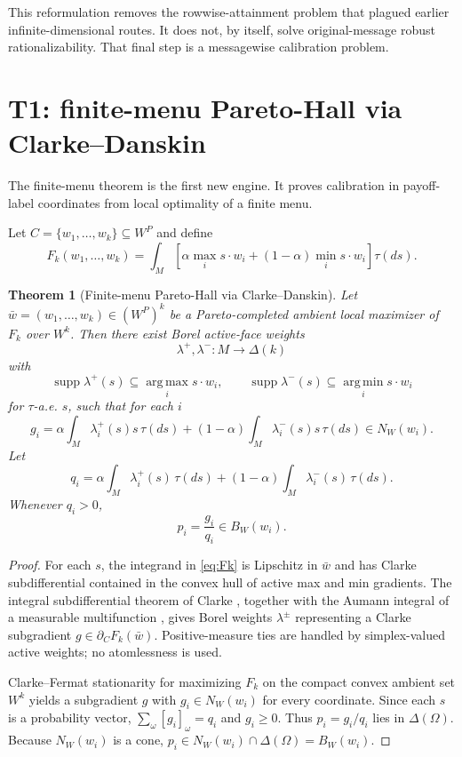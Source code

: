 \documentclass[11pt]{article}
\newtheorem{theorem}{Theorem}
\theoremstyle{definition}
\theoremstyle{remark}
\newcommand{\Om}{\Omega}
\newcommand{\suppset}{\operatorname{supp}}
\newcommand{\argmin}{\operatorname*{arg\,min}}
\newcommand{\argmax}{\operatorname*{arg\,max}}
\begin{document}
This reformulation removes the rowwise-attainment problem that plagued earlier infinite-dimensional routes. It does not, by itself, solve original-message robust rationalizability. That final step is a messagewise calibration problem.

\section{T1: finite-menu Pareto-Hall via Clarke--Danskin}\label{sec:t1}

The finite-menu theorem is the first new engine. It proves calibration in payoff-label coordinates from local optimality of a finite menu.

Let $C=\{w_1,\ldots,w_k\}\subseteq W^P$ and define
\begin{equation}\label{eq:Fk}
  F_k(w_1,\ldots,w_k)
  = \int_M\left[\alpha\max_i s\cdot w_i +(1-\alpha)
             \min_i s\cdot w_i\right]\tau(ds).
\end{equation}

\begin{theorem}[Finite-menu Pareto-Hall via Clarke--Danskin]\label{thm:T1}
Let $\bar w=(w_1,\ldots,w_k)\in(W^P)^k$ be a Pareto-completed ambient local maximizer of $F_k$ over $W^k$. Then there exist Borel active-face weights
\[
  \lambda^+,\lambda^-:M\to\Delta(k)
\]
with
\[
  \suppset\lambda^+(s)\subseteq\argmax_i s\cdot w_i,
  \qquad
  \suppset\lambda^-(s)\subseteq\argmin_i s\cdot w_i
\]
for $\tau$-a.e. $s$, such that for each $i$
\begin{equation}\label{eq:giqi}
  g_i
  = \alpha\int_M\lambda_i^+(s)s\,\tau(ds)
    +(1-\alpha)\int_M\lambda_i^-(s)s\,\tau(ds)
  \in N_W(w_i).
\end{equation}
Let
\begin{equation}\label{eq:qi}
  q_i
  = \alpha\int_M\lambda_i^+(s)\,\tau(ds)
    +(1-\alpha)\int_M\lambda_i^-(s)\,\tau(ds).
\end{equation}
Whenever $q_i>0$,
\begin{equation}\label{eq:pi}
  p_i=\frac{g_i}{q_i}\in B_W(w_i).
\end{equation}
\end{theorem}

\begin{proof}
For each $s$, the integrand in \eqref{eq:Fk} is Lipschitz in $\bar w$ and has Clarke subdifferential contained in the convex hull of active max and min gradients. The integral subdifferential theorem of Clarke \cite{Clarke1983}, together with the Aumann integral of a measurable multifunction \cite{Aumann1965,Hildenbrand1974}, gives Borel weights $\lambda^\pm$ representing a Clarke subgradient $g\in\partial_C F_k(\bar w)$. Positive-measure ties are handled by simplex-valued active weights; no atomlessness is used.

Clarke--Fermat stationarity for maximizing $F_k$ on the compact convex ambient set $W^k$ yields a subgradient $g$ with $g_i\in N_W(w_i)$ for every coordinate. Since each $s$ is a probability vector, $\sum_\omega[g_i]_\omega=q_i$ and $g_i\ge0$. Thus $p_i=g_i/q_i$ lies in $\Delta(\Om)$. Because $N_W(w_i)$ is a cone, $p_i\in N_W(w_i)\cap\Delta(\Om)=B_W(w_i)$.
\end{proof}
\end{document}

